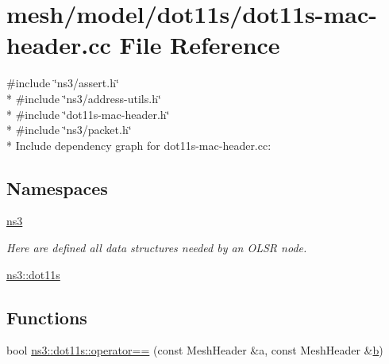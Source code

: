 \hypertarget{dot11s-mac-header_8cc}{}\section{mesh/model/dot11s/dot11s-\/mac-\/header.cc File Reference}
\label{dot11s-mac-header_8cc}
{\ttfamily \#include \char`\"{}ns3/assert.\+h\char`\"{}}\\*
{\ttfamily \#include \char`\"{}ns3/address-\/utils.\+h\char`\"{}}\\*
{\ttfamily \#include \char`\"{}dot11s-\/mac-\/header.\+h\char`\"{}}\\*
{\ttfamily \#include \char`\"{}ns3/packet.\+h\char`\"{}}\\*
Include dependency graph for dot11s-\/mac-\/header.cc\+:
\subsection*{Namespaces}
\begin{DoxyCompactItemize}
\item 
 \hyperlink{namespacens3}{ns3}
\begin{DoxyCompactList}\small\item\em Here are defined all data structures needed by an O\+L\+SR node. \end{DoxyCompactList}\item 
 \hyperlink{namespacens3_1_1dot11s}{ns3\+::dot11s}
\end{DoxyCompactItemize}
\subsection*{Functions}
\begin{DoxyCompactItemize}
\item 
bool \hyperlink{namespacens3_1_1dot11s_acadd63337d60944cc456d433eb374cbc}{ns3\+::dot11s\+::operator==} (const Mesh\+Header \&a, const Mesh\+Header \&\hyperlink{lte__pathloss_8m_a21ad0bd836b90d08f4cf640b4c298e7c}{b})
\end{DoxyCompactItemize}
